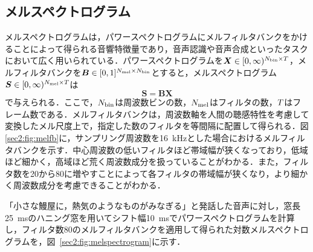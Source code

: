 \subsection{メルスペクトログラム}
メルスペクトログラムは，パワースペクトログラムにメルフィルタバンクをかけることによって得られる音響特徴量であり，音声認識や音声合成といったタスクにおいて広く用いられている．パワースペクトログラムを$\bm{X} \in [0, \infty)^{N_{\text{bin}} \times T}$，メルフィルタバンクを$\bm{B} \in [0, 1]^{N_{\text{mel}} \times N_{\text{bin}}}$とすると，メルスペクトログラム$\bm{S} \in [0, \infty)^{N_{\text{mel}} \times T}$は
\begin{equation}
    \bm{S} = \bm{B} \bm{X}
\end{equation}
で与えられる．ここで，$N_{\text{bin}}$は周波数ビンの数，$N_{\text{mel}}$はフィルタの数，$T$はフレーム数である．メルフィルタバンクは，周波数軸を人間の聴感特性を考慮して変換したメル尺度上で，指定した数のフィルタを等間隔に配置して得られる．図\ref{sec2:fig:melfb}に，サンプリング周波数を\SI{16}{\kHz}とした場合におけるメルフィルタバンクを示す．中心周波数の低いフィルタほど帯域幅が狭くなっており，低域ほど細かく，高域ほど荒く周波数成分を扱っていることがわかる．また，フィルタ数を20から80に増やすことによって各フィルタの帯域幅が狭くなり，より細かく周波数成分を考慮できることがわかる．

「小さな鰻屋に，熱気のようなものがみなぎる」と発話した音声に対し，窓長\SI{25}{\ms}のハニング窓を用いてシフト幅\SI{10}{\ms}でパワースペクトログラムを計算し，フィルタ数80のメルフィルタバンクを適用して得られた対数メルスペクトログラムを，図~\ref{sec2:fig:melspectrogram}に示す．

